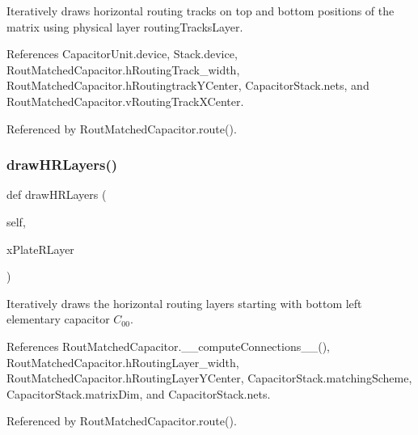 Iteratively draws horizontal routing tracks on top and bottom positions of the matrix using physical layer {\ttfamily routing\+Tracks\+Layer}. 



References Capacitor\+Unit.\+device, Stack.\+device, Rout\+Matched\+Capacitor.\+h\+Routing\+Track\+\_\+width, Rout\+Matched\+Capacitor.\+h\+Routingtrack\+Y\+Center, Capacitor\+Stack.\+nets, and Rout\+Matched\+Capacitor.\+v\+Routing\+Track\+X\+Center.



Referenced by Rout\+Matched\+Capacitor.\+route().

\mbox{\label{classpython_1_1capacitorrouted_1_1RoutMatchedCapacitor_aea5cf7e1dc273d8e1dc45e5f4d421f79}} 
\subsubsection{\texorpdfstring{draw\+H\+R\+Layers()}{drawHRLayers()}}
{\footnotesize\ttfamily def draw\+H\+R\+Layers (\begin{DoxyParamCaption}\item[{}]{self,  }\item[{}]{x\+Plate\+R\+Layer }\end{DoxyParamCaption})}



Iteratively draws the horizontal routing layers starting with bottom left elementary capacitor $ C_{00} $. 



References Rout\+Matched\+Capacitor.\+\_\+\+\_\+compute\+Connections\+\_\+\+\_\+(), Rout\+Matched\+Capacitor.\+h\+Routing\+Layer\+\_\+width, Rout\+Matched\+Capacitor.\+h\+Routing\+Layer\+Y\+Center, Capacitor\+Stack.\+matching\+Scheme, Capacitor\+Stack.\+matrix\+Dim, and Capacitor\+Stack.\+nets.



Referenced by Rout\+Matched\+Capacitor.\+route().

\mbox{\label{classpython_1_1capacitorrouted_1_1RoutMatchedCapacitor_a0d91006a08de265233844aa7d305d4d5}} 
